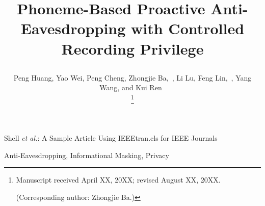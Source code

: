 \documentclass[10pt, journal, compsoc]{IEEEtran}
\begin{document}
\newcommand{\tdsc}[1]{{\color{blue}{#1}}}


\title{




Phoneme-Based Proactive Anti-Eavesdropping with Controlled Recording Privilege
}


\author{
Peng Huang, Yao Wei, Peng Cheng, Zhongjie Ba,~, Li Lu, Feng Lin,~, Yang Wang, and Kui Ren~

\thanks{Manuscript received April XX, 20XX; revised August XX, 20XX.

(Corresponding author: Zhongjie Ba.)
}
}

%
{Shell \MakeLowercase{\textit{et al.}}: A Sample Article Using IEEEtran.cls for IEEE Journals}

\maketitle

\begin{abstract}
    
\end{abstract}

\begin{IEEEkeywords}
    Anti-Eavesdropping, Informational Masking, Privacy
\end{IEEEkeywords}








% 


% 




\end{document}
